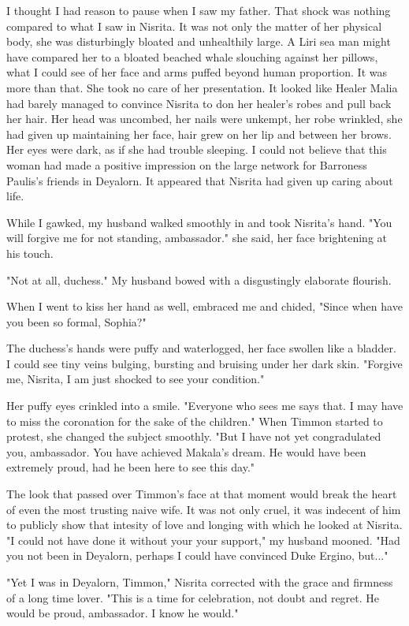 \documentclass{article}
\begin{document}
I thought I had reason to pause when I saw my father. That shock was nothing compared to what I saw in Nisrita. It was not only the matter of her physical body, she was disturbingly bloated and unhealthily large. A Liri sea man might have compared her to a bloated beached whale slouching against her pillows, what I could see of her face and arms puffed beyond human proportion. It was more than that. She took no care of her presentation. It looked like Healer Malia had barely managed to convince Nisrita to don her healer's robes and pull back her hair. Her head was uncombed, her nails were unkempt, her robe wrinkled, she had given up maintaining her face, hair grew on her lip and between her brows. Her eyes were dark, as if she had trouble sleeping. I could not believe that this woman had made a positive impression on the large network for Barroness Paulis's friends in Deyalorn. It appeared that Nisrita had given up caring about life.

While I gawked, my husband walked smoothly in and took Nisrita's hand. "You will forgive me for not standing, ambassador." she said, her face brightening at his touch.

"Not at all, duchess." My husband bowed with a disgustingly elaborate flourish.

When I went to kiss her hand as well, embraced me and chided, "Since when have you been so formal, Sophia?"

The duchess's hands were puffy and waterlogged, her face swollen like a bladder. I could see tiny veins bulging, bursting and bruising under her dark skin. "Forgive me, Nisrita, I am just shocked to see your condition."

Her puffy eyes crinkled into a smile. "Everyone who sees me says that. I may have to miss the coronation for the sake of the children." When Timmon started to protest, she changed the subject smoothly. "But I have not yet congradulated you, ambassador. You have achieved Makala's dream. He would have been extremely proud, had he been here to see this day."

The look that passed over Timmon's face at that moment would break the heart of even the most trusting naive wife. It was not only cruel, it was indecent of him to publicly show that intesity of love and longing with which he looked at Nisrita. "I could not have done it without your your support," my husband mooned. "Had you not been in Deyalorn, perhaps I could have convinced Duke Ergino, but..."

"Yet I was in Deyalorn, Timmon," Nisrita corrected with the grace and firmness of a long time lover. "This is a time for celebration, not doubt and regret. He would be proud, ambassador. I know he would."
\end{document}
